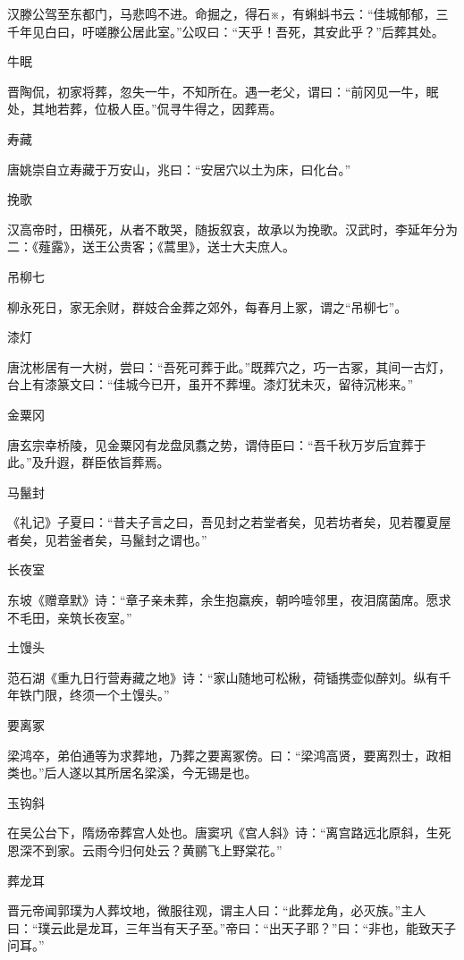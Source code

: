 \documentclass[a4paper,12pt,UTF8,twoside]{ctexbook}
\begin{document}
    汉滕公驾至东都门，马悲鸣不进。命掘之，得石※，有蝌蚪书云：“佳城郁郁，三千年见白曰，吁嗟滕公居此室。”公叹曰：“天乎！吾死，其安此乎？”后葬其处。
    
    牛眠
    
    晋陶侃，初家将葬，忽失一牛，不知所在。遇一老父，谓曰：“前冈见一牛，眠处，其地若葬，位极人臣。”侃寻牛得之，因葬焉。
    
    寿藏
    
    唐姚崇自立寿藏于万安山，兆曰：“安居穴以土为床，曰化台。”
    
    挽歌
    
    汉高帝时，田横死，从者不敢哭，随扳叙哀，故承以为挽歌。汉武时，李延年分为二：《薤露》，送王公贵客；《蒿里》，送士大夫庶人。
    
    吊柳七
    
    柳永死日，家无余财，群妓合金葬之郊外，每春月上冢，谓之“吊柳七”。
    
    漆灯
    
    唐沈彬居有一大树，尝曰：“吾死可葬于此。”既葬穴之，巧一古冢，其间一古灯，台上有漆篆文曰：“佳城今已开，虽开不葬埋。漆灯犹未灭，留待沉彬来。”
    
    金粟冈
    
    唐玄宗幸桥陵，见金粟冈有龙盘凤翥之势，谓侍臣曰：“吾千秋万岁后宜葬于此。”及升遐，群臣依旨葬焉。
    
    马鬣封
    
    《礼记》子夏曰：“昔夫子言之曰，吾见封之若堂者矣，见若坊者矣，见若覆夏屋者矣，见若釜者矣，马鬣封之谓也。”
    
    长夜室
    
    东坡《赠章默》诗：“章子亲未葬，余生抱羸疾，朝吟噎邻里，夜泪腐菌席。愿求不毛田，亲筑长夜室。”
    
    土馒头
    
    范石湖《重九日行营寿藏之地》诗：“家山随地可松楸，荷锸携壶似醉刘。纵有千年铁门限，终须一个土馒头。”
    
    要离冢
    
    梁鸿卒，弟伯通等为求葬地，乃葬之要离冢傍。曰：“梁鸿高贤，要离烈士，政相类也。”后人遂以其所居名梁溪，今无锡是也。
    
    玉钩斜
    
    在吴公台下，隋炀帝葬宫人处也。唐窦巩《宫人斜》诗：“离宫路远北原斜，生死恩深不到家。云雨今归何处云？黄鹂飞上野棠花。”
    
    葬龙耳
    
    晋元帝闻郭璞为人葬坟地，微服往观，谓主人曰：“此葬龙角，必灭族。”主人曰：“璞云此是龙耳，三年当有天子至。”帝曰：“出天子耶？”曰：“非也，能致天子问耳。”
    
\end{document}
